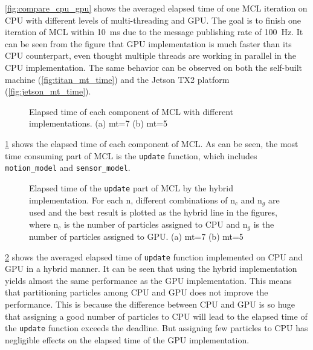 \Fig \ref{fig:compare_cpu_gpu} shows the averaged elapsed time of one MCL iteration
on CPU with different levels of multi-threading and GPU.
The goal is to finish one iteration of MCL within \SI{10}{\ms} due to the message
publishing rate of \SI{100}{\hertz}.
It can be seen from the figure that GPU implementation is much faster than its CPU
counterpart, even thought multiple threads are working in parallel in the CPU
implementation.
The same behavior can be observed on both the self-built machine
(\Fig \ref{fig:titan_mt_time}) and the Jetson TX2 platform
(\Fig \ref{fig:jetson_mt_time}).


\begin{figure}[!h]
  \hfil
  \caption{Elapsed time of each component of MCL with different implementations.
    (a) mt=7 (b) mt=5}
  \label{fig:component_timing}
\end{figure}

\Fig \ref{fig:component_timing} shows the elapsed time of each component of MCL.
As can be seen, the most time consuming part of MCL is the \texttt{update} function,
which includes \texttt{motion\_model} and \texttt{sensor\_model}.


\begin{figure}[!h]
  \hfil
  \caption{Elapsed time of the \texttt{update} part of MCL by the hybrid implementation.
    For each n, different combinations of $\text{n}_c$ and $\text{n}_g$ are used
    and the best result is plotted as the hybrid line in the figures, where
    $\text{n}_c$ is the number of particles assigned to CPU and $\text{n}_g$ is
    the number of particles assigned to GPU.
    (a) mt=7 (b) mt=5}
  \label{fig:hybrid_timing}
\end{figure}

\Fig \ref{fig:hybrid_timing} shows the averaged elapsed time of \texttt{update}
function implemented on CPU and GPU in a hybrid manner.
It can be seen that using the hybrid implementation yields almost the same
performance as the GPU implementation.
This means that partitioning particles among CPU and GPU does not improve the
performance.
This is because the difference between CPU and GPU is so huge that assigning
a good number of  particles to CPU will lead to the elapsed time of the
\texttt{update} function exceeds the deadline.
But assigning few particles to CPU has negligible effects on the elapsed time
of the GPU implementation.





